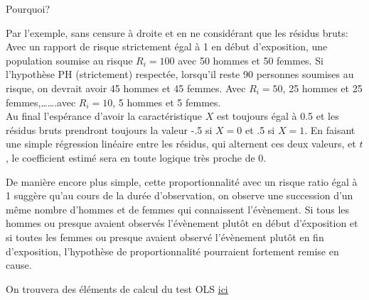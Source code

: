 \documentclass[
  12pt,
  letterpaper,
  DIV=11,
  numbers=noendperiod,
  onepage,
  openany]{scrreprt}
\begin{document}
Pourquoi?

Par l'exemple, sans censure à droite et en ne considérant que les
résidus bruts: Avec un rapport de risque strictement égal à 1 en début
d'exposition, une population soumise au risque \(R_i=100\) avec 50
hommes et 50 femmes. Si l'hypothèse PH (strictement) respectée,
lorsqu'il reste 90 personnes soumises au risque, on devrait avoir 45
hommes et 45 femmes. Avec \(R_i=50\), 25 hommes et 25
femmes,\ldots\ldots.avec \(R_i=10\), 5 hommes et 5 femmes.\\
Au final l'espérance d'avoir la caractéristique \(X\) est toujours égal
à 0.5 et les résidus bruts prendront toujours la valeur -.5 si \(X=0\)
et .5 si \(X=1\). En faisant une simple régression linéaire entre les
résidus, qui alternent ces deux valeurs, et \(t\), le coefficient estimé
sera en toute logique très proche de 0.

De manière encore plus simple, cette proportionnalité avec un risque
ratio égal à 1 suggère qu'au cours de la durée d'observation, on observe
une succession d'un même nombre d'hommes et de femmes qui connaissent
l'évènement. Si tous les hommes ou presque avaient observés l'évènement
plutôt en début d'éxposition et si toutes les femmes ou presque avaient
observé l'évènement plutôt en fin d'exposition, l'hypothèse de
proportionnalité pourraient fortement remise en cause.

On trouvera des éléments de calcul du test OLS
\href{https://mthevenin.github.io/analyse_duree/annexes/residusch.html}{ici}
\end{document}

